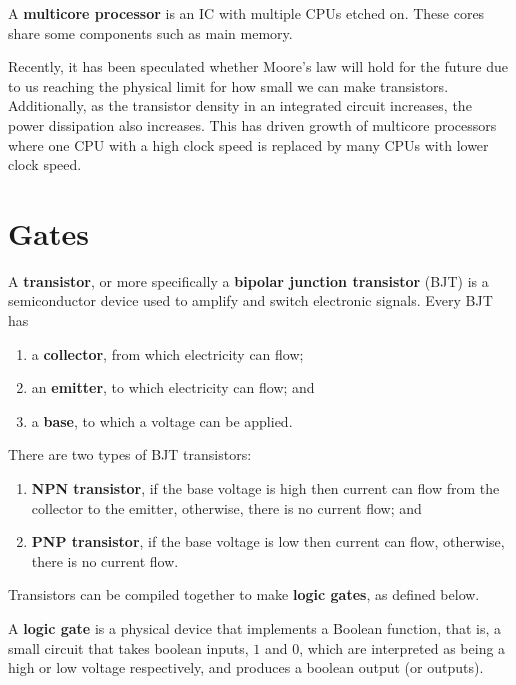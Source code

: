 \begin{definition}
    A \textbf{multicore processor} is an IC with multiple CPUs etched on. These cores share some components such as main memory.
\end{definition}

Recently, it has been speculated whether Moore's law will hold for the future due to us reaching the physical limit for how small we can make transistors. Additionally, as the transistor density in an integrated circuit increases, the power dissipation also increases. This has driven growth of multicore processors where one CPU with a high clock speed is replaced by many CPUs with lower clock speed.

\section{Gates}

\begin{definition}
    A \textbf{transistor}, or more specifically a \textbf{bipolar junction transistor} (BJT) is a semiconductor device used to amplify and switch electronic signals. Every BJT has
    \begin{enumerate}
        \item a \textbf{collector}, from which electricity can flow;
        \item an \textbf{emitter}, to which electricity can flow; and
        \item a \textbf{base}, to which a voltage can be applied.
    \end{enumerate}
    
    There are two types of BJT transistors:
    \begin{enumerate}
        \item \textbf{NPN transistor}, if the base voltage is high then current can flow from the collector to the emitter, otherwise, there is no current flow; and
        \item \textbf{PNP transistor}, if the base voltage is low then current can flow, otherwise, there is no current flow.
    \end{enumerate}
\end{definition}


Transistors can be compiled together to make \textbf{logic gates}, as defined below.

\begin{definition}
    A \textbf{logic gate} is a physical device that implements a Boolean function, that is, a small circuit that takes boolean inputs, $1$ and $0$, which are interpreted as being a high or low voltage respectively, and produces a boolean output (or outputs).
\end{definition}

